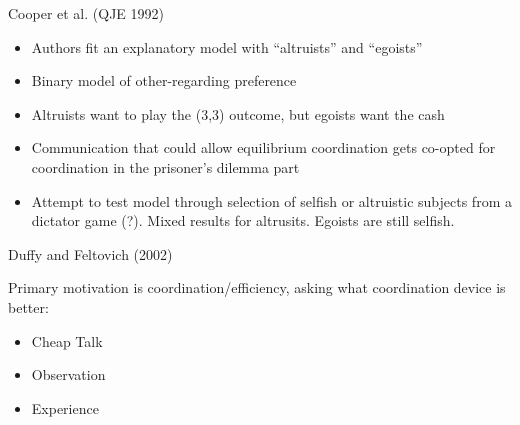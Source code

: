 \documentclass{beamer}
\begin{document}
\begin{frame}{Cooper et al. (QJE 1992)}
    \begin{card}
    	\begin{itemize}
    		\item Authors fit an explanatory model with ``altruists'' and ``egoists''
    		\item Binary model of other-regarding preference
    		\item Altruists want to play the (3,3) outcome, but egoists want the cash\pause
    		\item Communication that could allow equilibrium coordination gets co-opted for coordination in the prisoner's dilemma part \pause
    		\item Attempt to test model through selection of selfish or altruistic subjects from a dictator game (?). Mixed results for altrusits. Egoists are still selfish.
    	\end{itemize}
    \end{card}
\end{frame}

\begin{frame}{Duffy and Feltovich (2002)}
\begin{card}
 Primary motivation is coordination/efficiency, asking what coordination device is better:
	 \begin{itemize}
		 \item Cheap Talk
		 \item Observation
		 \item Experience
	\end{itemize}
\end{card}
\end{frame}
\end{document}
